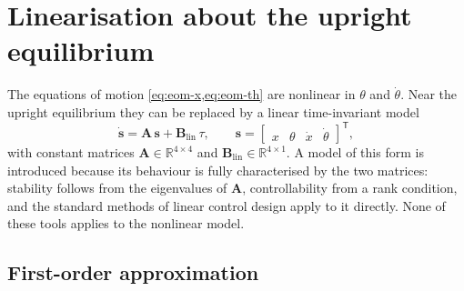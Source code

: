 \section{Linearisation about the upright equilibrium}\label{sec:lin}

The equations of motion \cref{eq:eom-x,eq:eom-th} are nonlinear in $\theta$ and
$\dot\theta$. Near the upright equilibrium they can be replaced by a linear
time-invariant model
\begin{equation}
  \dot{\bm s} = \bm A\,\bm s + \bm B_{\mathrm{lin}}\,\tau ,
  \qquad \bm s = \begin{bmatrix} x & \theta & \dot x & \dot\theta \end{bmatrix}^{\mathsf T},
  \label{eq:lti}
\end{equation}
with constant matrices $\bm A\in\mathbb R^{4\times4}$ and
$\bm B_{\mathrm{lin}}\in\mathbb R^{4\times1}$. A model of this form is
introduced because its behaviour is fully characterised by the two matrices:
stability follows from the eigenvalues of $\bm A$, controllability from a rank
condition, and the standard methods of linear control design apply to it
directly. None of these tools applies to the nonlinear model.

\subsection{First-order approximation}

